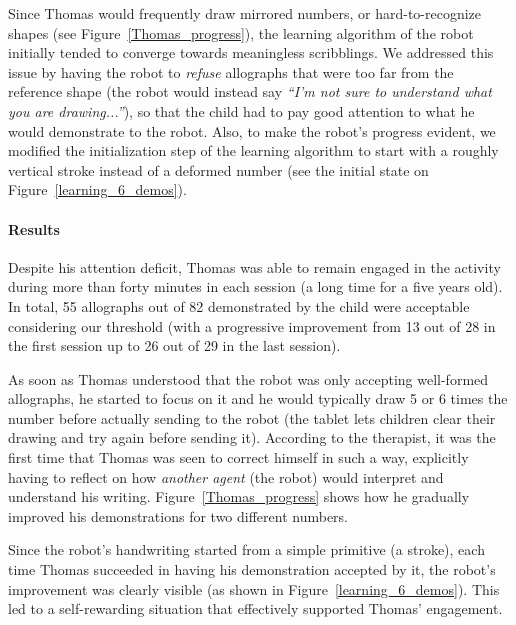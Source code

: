 \documentclass{article}
\begin{document}
Since Thomas would frequently draw mirrored numbers, or hard-to-recognize shapes
(see Figure~\ref{Thomas_progress}), the learning algorithm of the robot
initially tended to converge towards meaningless scribblings. We addressed this
issue by having the robot to \emph{refuse} allographs that were too far from the
reference shape (the robot would instead say \emph{``I'm not sure to understand
what you are drawing...''}), so that the child had to pay good attention to what
he would demonstrate to the robot. Also, to make the robot's progress evident,
we modified the initialization step of the learning algorithm to start with a
roughly vertical stroke instead of a deformed number (see the initial state on
Figure~\ref{learning_6_demos}).

%

\paragraph{Results}

Despite his attention deficit, Thomas was able to remain engaged in the activity
during more than forty minutes in each session (a long time for a five years
old). In total, 55 allographs out of 82 demonstrated by the child were
acceptable considering our threshold (with a progressive improvement from 13 out
of 28 in the first session up to 26 out of 29 in the last session).

As soon as Thomas understood that the robot was only accepting well-formed
allographs, he started to focus on it and he would typically draw 5 or 6 times
the number before actually sending to the robot (the tablet lets children clear
their drawing and try again before sending it). According to the therapist, it
was the first time that Thomas was seen to correct himself in such a way,
explicitly having to reflect on how \emph{another agent} (the robot) would
interpret and understand his writing. Figure~\ref{Thomas_progress} shows how he
gradually improved his demonstrations for two different numbers.

Since the robot's handwriting started from a simple primitive (a stroke), each
time Thomas succeeded in having his demonstration accepted by it, the robot's
improvement was clearly visible (as shown in Figure~\ref{learning_6_demos}).
This led to a self-rewarding situation that effectively supported Thomas'
engagement.
\end{document}
